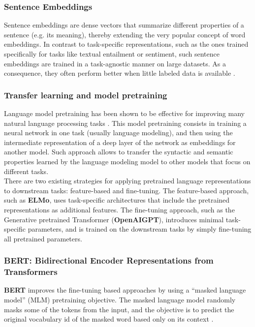 \subsubsection{Sentence Embeddings}
Sentence embeddings are dense vectors that summarize different properties of a sentence (e.g. its meaning), thereby extending the very popular concept of word embeddings. In contrast to task-specific representations, such as the ones trained specifically for tasks like textual entailment or sentiment, such sentence embeddings are trained in a task-agnostic manner on large datasets. As a consequence, they often perform better when little labeled data is available \cite{rckl2018concatenated}.

\subsubsection{Transfer learning and model pretraining}
Language  model  pretraining  has  been  shown  to be effective for improving many natural language processing tasks \cite{devlin2018bert}. This model pretraining consists in training a neural network in one task (usually language modeling), and then using the intermediate representation of a deep layer of the network as embeddings for another model. Such approach allows to transfer the syntactic and semantic properties learned by the language modeling model to other models that focus on different tasks.\\
There  are  two  existing  strategies  for  applying pretrained language representations to downstream tasks: feature-based and fine-tuning. The feature-based  approach, such as {\bf ELMo}, uses task-specific architectures that include the pretrained representations as additional features. The fine-tuning approach, such as the Generative pretrained Transformer ({\bf OpenAIGPT}), introduces minimal task-specific  parameters,  and  is  trained  on  the downstream  tasks  by  simply  fine-tuning all pretrained parameters.

\subsubsection{BERT: Bidirectional Encoder Representations from Transformers}
{\bf BERT} improves the fine-tuning based approaches by using a “masked language  model” (MLM)  pretraining  objective. The masked language model randomly masks some of the tokens from the input, and the objective is to predict the original vocabulary id of the masked word  based only on its context \cite{devlin2018bert}.

